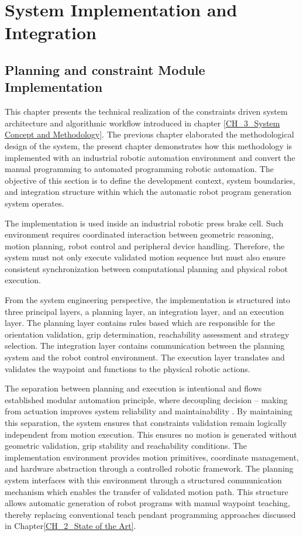 \chapter{System Implementation and Integration}
\label{System Implementation and Integration }

\section{Planning and constraint Module Implementation}
\label{Planning and constraint Module Implementation}

This chapter presents the technical realization of the constraints driven system architecture and algorithmic workflow introduced in chapter \ref{CH_3_System Concept and Methodology}. The previous chapter elaborated the methodological design of the system, the present chapter demonstrates how this methodology is implemented with an industrial robotic automation environment and convert the manual programming to automated programming robotic automation. The objective of this section is to define the development context, system boundaries, and integration structure within which the automatic robot program generation system operates.
\par The implementation is used inside an industrial robotic press brake cell. Such environment requires coordinated interaction between geometric reasoning, motion planning, robot control and peripheral device handling. Therefore, the system must not only execute validated motion sequence but must also ensure consistent synchronization between computational planning and physical robot execution.
\par From the system engineering perspective, the implementation is structured into three principal layers, a planning layer, an integration layer, and an execution layer. The planning layer contains rules based which are responsible for the orientation validation, grip determination, reachability assessment and strategy selection. The integration layer contains communication between the planning system and the robot control environment. The execution layer translates and validates the waypoint and functions to the physical robotic actions.
\par The separation between planning and execution is intentional and flows established modular automation principle, where decoupling decision – making from actuation improves system reliability and maintainability \cite{Thramboulidis2013MDE}. By maintaining this separation, the system ensures that constraints validation remain logically independent from motion execution. This ensures no motion is generated without geometric validation, grip stability and reachability conditions. The implementation environment provides motion primitives, coordinate management, and hardware abstraction through a controlled robotic framework. The planning system interfaces with this environment through a structured communication mechanism which enables the transfer of validated motion path. This structure allows automatic generation of robot programs with manual waypoint teaching, thereby replacing conventional teach pendant programming approaches discussed in Chapter\ref{CH_2_State of the Art}.

